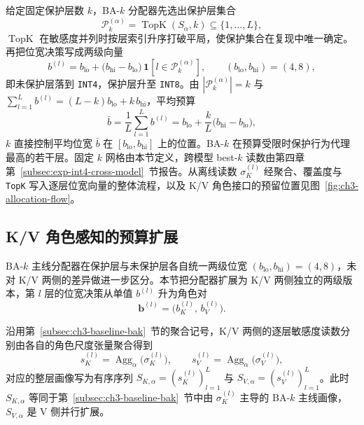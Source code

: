 给定固定保护层数 $k$，BA-$k$ 分配器先选出保护层集合
\begin{equation}
\mathcal P_k^{(\alpha)}
=
\operatorname{TopK}(S_{\alpha},k)\subseteq\{1,\dots,L\},
\end{equation}
$\operatorname{TopK}$ 在敏感度并列时按层索引升序打破平局，使保护集合在复现中唯一确定。再把位宽决策写成两级向量
\begin{equation}
b^{(l)}
=
b_{\mathrm{lo}}
+
\bigl(b_{\mathrm{hi}}-b_{\mathrm{lo}}\bigr)\,
\mathbf 1\!\left[l\in \mathcal P_k^{(\alpha)}\right],
\qquad (b_{\mathrm{lo}},b_{\mathrm{hi}})=(4,8),
\end{equation}
即未保护层落到 \texttt{INT4}，保护层升至 \texttt{INT8}。由 $|\mathcal P_k^{(\alpha)}|=k$ 与 $\sum_{l=1}^{L}b^{(l)}=(L-k)b_{\mathrm{lo}}+k\,b_{\mathrm{hi}}$，平均预算
\begin{equation}
\bar b
=
\frac{1}{L}\sum_{l=1}^{L}b^{(l)}
=
b_{\mathrm{lo}}+\frac{k}{L}\bigl(b_{\mathrm{hi}}-b_{\mathrm{lo}}\bigr),
\end{equation}
$k$ 直接控制平均位宽 $\bar b$ 在 $[b_{\mathrm{lo}},b_{\mathrm{hi}}]$ 上的位置。BA-$k$ 在预算受限时保护行为代理最高的若干层。固定 $k$ 网格由本节定义，跨模型 best-$k$ 读数由第四章第~\ref{subsec:exp-int4-cross-model}~节报告。从离线读数 $\sigma_K^{(l)}$ 经聚合、覆盖度与 \texttt{TopK} 写入逐层位宽向量的整体流程，以及 K/V 角色接口的预留位置见图~\ref{fig:ch3-allocation-flow}。



\subsection{K/V 角色感知的预算扩展}
\label{subsec:ch3-budget-kv}

BA-$k$ 主线分配器在保护层与未保护层各自统一两级位宽 $(b_\mathrm{lo}, b_\mathrm{hi}) = (4,8)$，未对 K/V 两侧的差异做进一步区分。本节把分配器扩展为 K/V 两侧独立的两级版本，第 $l$ 层的位宽决策从单值 $b^{(l)}$ 升为角色对
\begin{equation}
\mathbf b^{(l)}
=
\bigl(b_K^{(l)},\, b_V^{(l)}\bigr).
\end{equation}

沿用第~\ref{subsec:ch3-baseline-bak}~节的聚合记号，K/V 两侧的逐层敏感度读数分别由各自的角色尺度张量聚合得到
\begin{equation}
s_K^{(l)}
=
\operatorname{Agg}_\alpha\!\bigl(\sigma_K^{(l)}\bigr),
\qquad
s_V^{(l)}
=
\operatorname{Agg}_\alpha\!\bigl(\sigma_V^{(l)}\bigr),
\end{equation}
对应的整层画像写为有序序列 $S_{K,\alpha}=(s_K^{(l)})_{l=1}^{L}$ 与 $S_{V,\alpha}=(s_V^{(l)})_{l=1}^{L}$。此时 $S_{K,\alpha}$ 等同于第~\ref{subsec:ch3-baseline-bak}~节中由 $\sigma_K^{(l)}$ 主导的 BA-$k$ 主线画像，$S_{V,\alpha}$ 是 V 侧并行扩展。

